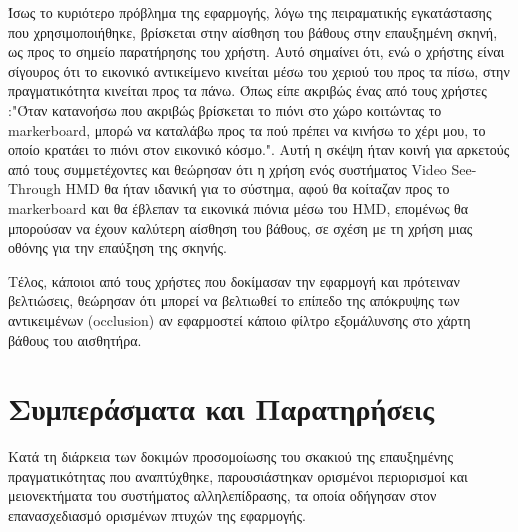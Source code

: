 Ίσως το κυριότερο πρόβλημα της εφαρμογής, λόγω της πειραματικής εγκατάστασης που χρησιμοποιήθηκε, βρίσκεται στην αίσθηση του βάθους στην επαυξημένη σκηνή, ως προς το σημείο παρατήρησης του χρήστη. Αυτό σημαίνει ότι, ενώ ο χρήστης είναι σίγουρος ότι το εικονικό αντικείμενο κινείται μέσω του χεριού του προς τα πίσω, στην πραγματικότητα κινείται προς τα πάνω. Όπως είπε ακριβώς ένας από τους χρήστες :"Όταν κατανοήσω που ακριβώς βρίσκεται το πιόνι στο χώρο κοιτώντας το markerboard, μπορώ να καταλάβω προς τα πού πρέπει να κινήσω το χέρι μου, το οποίο κρατάει το πιόνι στον εικονικό κόσμο.". Αυτή η σκέψη ήταν κοινή για αρκετούς από τους συμμετέχοντες και θεώρησαν ότι η χρήση ενός συστήματος Video See-Through HMD θα ήταν ιδανική για το σύστημα, αφού θα κοίταζαν προς το markerboard και θα έβλεπαν τα εικονικά πιόνια μέσω του HMD, επομένως θα μπορούσαν να έχουν καλύτερη αίσθηση του βάθους, σε σχέση με τη χρήση μιας οθόνης για την επαύξηση της σκηνής.



Τέλος, κάποιοι από τους χρήστες που δοκίμασαν την εφαρμογή και πρότειναν βελτιώσεις, θεώρησαν ότι μπορεί να βελτιωθεί το επίπεδο της απόκρυψης των αντικειμένων (occlusion) αν εφαρμοστεί κάποιο φίλτρο εξομάλυνσης στο χάρτη βάθους του αισθητήρα.







\section{Συμπεράσματα και Παρατηρήσεις} \label{sec:conclusion}


Κατά τη διάρκεια των δοκιμών προσομοίωσης του σκακιού της επαυξημένης πραγματικότητας που αναπτύχθηκε, παρουσιάστηκαν ορισμένοι περιορισμοί και μειονεκτήματα του συστήματος αλληλεπίδρασης, τα οποία οδήγησαν στον επανασχεδιασμό ορισμένων πτυχών της εφαρμογής. 


